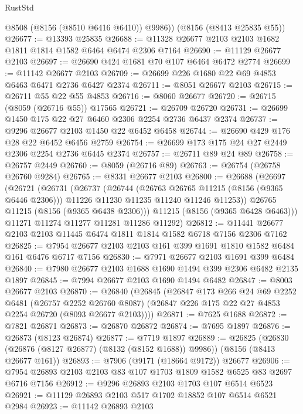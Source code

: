 \begin{lexlean}{RustStd}
\begin{coremodule}
        @8508
        (@8156 (@8510 @6416 @6410))
        @9986))
    (@8156 (@8413 @25835 @55))
@26677 := @13393 @25835
@26688 := @11328 @26677 @2103 @2103 @1682 @1811 @1814 @1582 @6464 @6474 @2306 @7164
@26690 := @11129 @26677 @2103
@26697 := @26690 @424 @1681 @70 @107 @6464 @6472 @2774
@26699 := @11142 @26677 @2103
@26709 := @26699 @226 @1680 @22 @69 @4853 @6463 @6471 @2736 @6427 @2374
@26711 := @8051 @26677 @2103
@26715 := @26711 @55 @22 @55 @4853
@26716 := @8060 @26677
@26720 := @26715 (@8059 (@26716 @55)) @17565
@26721 := @26709 @26720
@26731 := @26699 @1450 @175 @22 @27 @6460 @2306 @2254 @2736 @6437 @2374
@26737 := @9296 @26677 @2103 @1450 @22 @6452 @6458
@26744 := @26690 @429 @176 @28 @22 @6452 @6456 @2759
@26754 := @26699 @173 @175 @24 @27 @2449 @2306 @2254 @2736 @6445 @2374
@26757 := @26711 @89 @24 @89
@26758 := @26757 @2449
@26760 := @8059 (@26716 @89)
@26763 := @26754 (@26758 @26760 @9284)
@26765 := @8331 @26677 @2103
@26800 := @26688
    (@26697
      (@26721
        (@26731
          (@26737
            (@26744
              (@26763 @26765 @11215 (@8156 (@9365 @6446 @2306)))
              @11226
              @11230
              @11235
              @11240
              @11246
              @11253))
          @26765
          @11215
          (@8156 (@9365 @6438 @2306)))
        @11215
        (@8156 (@9365 @6428 @6463)))
      @11271
      @11274
      @11277
      @11281
      @11286
      @11292)
@26812 := @11441 @26677 @2103 @2103 @11445 @6474 @1811 @1814 @1582 @6718 @7156 @2306 @7162
@26825 := @7954 @26677 @2103 @2103 @161 @399 @1691 @1810 @1582 @6484 @161 @6476 @6717 @7156
@26830 := @7971 @26677 @2103 @1691 @399 @6484
@26840 := @7980 @26677 @2103 @1688 @1690 @1494 @399 @2306 @6482 @2135 @1897
@26845 := @7994 @26677 @2103 @1690 @1494 @6482
@26847 := @8003 @26677 @2103
@26870 := @26840
    (@26845
      (@26847
        @173
        @266
        @24
        @69
        @2252
        @6481
        (@26757 @2252 @26760 @8087)
        (@26847 @226 @175 @22 @27 @4853 @2254 @26720 (@8093 @26677 @2103))))
@26871 := @7625 @1688
@26872 := @7821 @26871
@26873 := @26870 @26872
@26874 := @7695 @1897
@26876 := @26873 (@8123 @26874)
@26877 := @7719 @1897
@26889 := @26825
    (@26830 (@26876 (@8127 @26877) (@8132 (@8152 @1688)) @9986))
    (@8156 (@8413 @26677 @161))
@26893 := @7906 (@9171 (@18664 @9172)) @26677
@26906 := @7954 @26893 @2103 @2103 @83 @107 @1703 @1809 @1582 @6525 @83 @2697 @6716 @7156
@26912 := @9296 @26893 @2103 @1703 @107 @6514 @6523
@26921 := @11129 @26893 @2103 @517 @1702 @18852 @107 @6514 @6521 @2984
@26923 := @11142 @26893 @2103

\end{coremodule}
\end{lexlean}
